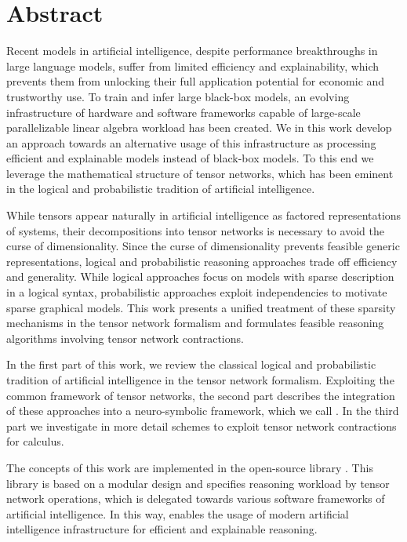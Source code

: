 \chapter{Abstract}

Recent models in artificial intelligence, despite performance breakthroughs in large language models, suffer from limited efficiency and explainability, which prevents them from unlocking their full application potential for economic and trustworthy use.
To train and infer large black-box models, an evolving infrastructure of hardware and software frameworks capable of large-scale parallelizable linear algebra workload has been created.
We in this work develop an approach towards an alternative usage of this infrastructure as processing efficient and explainable models instead of black-box models.
To this end we leverage the mathematical structure of tensor networks, which has been eminent in the logical and probabilistic tradition of artificial intelligence.

While tensors appear naturally in artificial intelligence as factored representations of systems, their decompositions into tensor networks is necessary to avoid the curse of dimensionality. %
Since the curse of dimensionality prevents feasible generic representations, logical and probabilistic reasoning approaches trade off efficiency and generality.
While logical approaches focus on models with sparse description in a logical syntax, probabilistic approaches exploit independencies to motivate sparse graphical models.
This work presents a unified treatment of these sparsity mechanisms in the tensor network formalism and formulates feasible reasoning algorithms involving tensor network contractions.

In the first part of this work, we review the classical logical and probabilistic tradition of artificial intelligence in the tensor network formalism.
Exploiting the common framework of tensor networks, the second part describes the integration of these approaches into a neuro-symbolic framework, which we call \HybridLogicNetworks{}.
In the third part we investigate in more detail schemes to exploit tensor network contractions for calculus.

The concepts of this work are implemented in the open-source \python{} library \tnreason{}.
This library is based on a modular design and specifies reasoning workload by tensor network operations, which is delegated towards various software frameworks of artificial intelligence.
In this way, \tnreason{} enables the usage of modern artificial intelligence infrastructure for efficient and explainable reasoning.